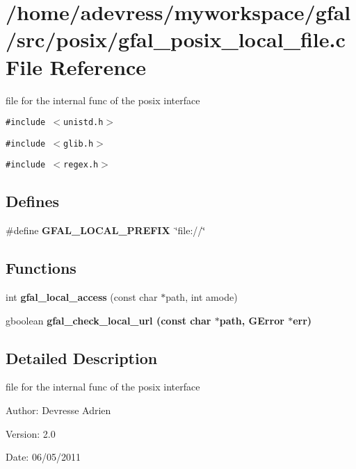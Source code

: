 \section{/home/adevress/myworkspace/gfal/src/posix/gfal\_\-posix\_\-local\_\-file.c File Reference}
\label{gfal__posix__local__file_8c}
file for the internal func of the posix interface 

{\tt \#include $<$unistd.h$>$}\par
{\tt \#include $<$glib.h$>$}\par
{\tt \#include $<$regex.h$>$}\par
\subsection*{Defines}
\begin{CompactItemize}
\item 
\#define \textbf{GFAL\_\-LOCAL\_\-PREFIX}~\char`\"{}file://\char`\"{}\label{gfal__posix__local__file_8c_72e3f23638773071a6db4d9a354ccfdb}

\end{CompactItemize}
\subsection*{Functions}
\begin{CompactItemize}
\item 
int \textbf{gfal\_\-local\_\-access} (const char $\ast$path, int amode)\label{gfal__posix__local__file_8c_7ed4fde5469d13941ddf88ed5ae9688d}

\item 
gboolean \bf{gfal\_\-check\_\-local\_\-url} (const char $\ast$path, GError $\ast$err)
\end{CompactItemize}


\subsection{Detailed Description}
file for the internal func of the posix interface 

\begin{Desc}
\item[Author:]Devresse Adrien \end{Desc}
\begin{Desc}
\item[Version:]2.0 \end{Desc}
\begin{Desc}
\item[Date:]06/05/2011 \end{Desc}


